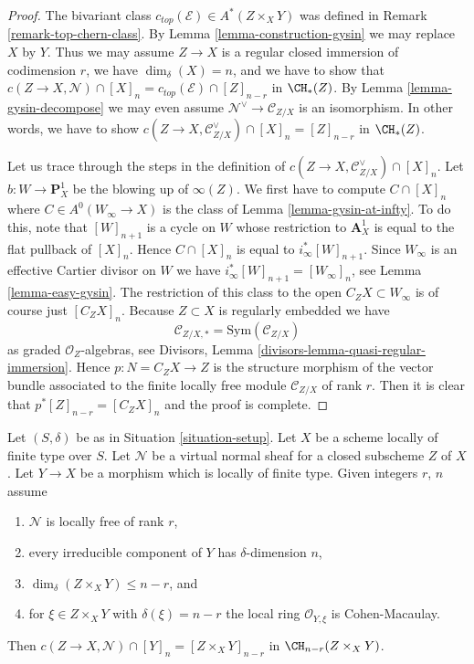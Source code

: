 \begin{proof}
The bivariant class $c_{top}(\mathcal{E}) \in A^*(Z \times_X Y)$ was
defined in Remark \ref{remark-top-chern-class}.
By Lemma \ref{lemma-construction-gysin} we may replace $X$ by $Y$.
Thus we may assume $Z \to X$ is a regular closed immersion
of codimension $r$, we have $\dim_\delta(X) = n$, and we have
to show that $c(Z \to X, \mathcal{N}) \cap [X]_n =
c_{top}(\mathcal{E}) \cap [Z]_{n - r}$ in $\CH_*(Z)$.
By Lemma \ref{lemma-gysin-decompose} we may even assume
$\mathcal{N}^\vee \to \mathcal{C}_{Z/X}$ is an isomorphism.
In other words, we have to show
$c(Z \to X, \mathcal{C}_{Z/X}^\vee) \cap [X]_n = [Z]_{n - r}$ in $\CH_*(Z)$.

\medskip\noindent
Let us trace through the steps in the definition of
$c(Z \to X, \mathcal{C}_{Z/X}^\vee) \cap [X]_n$. Let
$b : W \to \mathbf{P}^1_X$
be the blowing up of $\infty(Z)$. We first have to compute
$C \cap [X]_n$ where $C \in A^0(W_\infty \to X)$ is
the class of Lemma \ref{lemma-gysin-at-infty}.
To do this, note that $[W]_{n + 1}$
is a cycle on $W$ whose restriction to $\mathbf{A}^1_X$ is
equal to the flat pullback of $[X]_n$. Hence $C \cap [X]_n$
is equal to $i_\infty^*[W]_{n + 1}$. Since $W_\infty$ is an
effective Cartier divisor on $W$ we have
$i_\infty^*[W]_{n + 1} = [W_\infty]_n$, see Lemma \ref{lemma-easy-gysin}.
The restriction of this class to the open $C_ZX \subset W_\infty$
is of course just $[C_ZX]_n$. Because $Z \subset X$ is regularly
embedded we have
$$
\mathcal{C}_{Z/X, *} = \text{Sym}(\mathcal{C}_{Z/X})
$$
as graded $\mathcal{O}_Z$-algebras, see
Divisors, Lemma \ref{divisors-lemma-quasi-regular-immersion}.
Hence $p : N = C_ZX \to Z$ is the structure morphism of the
vector bundle associated to the finite locally free module
$\mathcal{C}_{Z/X}$ of rank $r$. Then it is clear that
$p^*[Z]_{n - r} = [C_ZX]_n$ and the proof is complete.
\end{proof}

\begin{lemma}
\label{lemma-gysin-easy}
Let $(S, \delta)$ be as in Situation \ref{situation-setup}. Let $X$ be a scheme
locally of finite type over $S$. Let $\mathcal{N}$ be a virtual normal
sheaf for a closed subscheme $Z$ of $X$. Let $Y \to X$ be a morphism
which is locally of finite type. Given integers $r$, $n$ assume
\begin{enumerate}
\item $\mathcal{N}$ is locally free of rank $r$,
\item every irreducible component of $Y$ has $\delta$-dimension $n$,
\item $\dim_\delta(Z \times_X Y) \leq n - r$, and
\item for $\xi \in Z \times_X Y$ with $\delta(\xi) = n - r$
the local ring $\mathcal{O}_{Y, \xi}$ is Cohen-Macaulay.
\end{enumerate}
Then $c(Z \to X, \mathcal{N}) \cap [Y]_n = [Z \times_X Y]_{n - r}$
in $\CH_{n - r}(Z \times_X Y)$.
\end{lemma}

